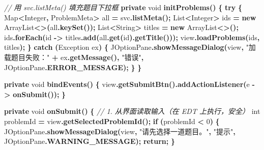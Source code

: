 \documentclass[
  11pt,
]{ctexart}
\newenvironment{Shaded}{\begin{snugshade}}{\end{snugshade}}
\newcommand{\BuiltInTok}[1]{#1}
\newcommand{\CommentTok}[1]{\textcolor[rgb]{0.56,0.35,0.01}{\textit{#1}}}
\newcommand{\ControlFlowTok}[1]{\textcolor[rgb]{0.13,0.29,0.53}{\textbf{#1}}}
\newcommand{\DataTypeTok}[1]{\textcolor[rgb]{0.13,0.29,0.53}{#1}}
\newcommand{\DecValTok}[1]{\textcolor[rgb]{0.00,0.00,0.81}{#1}}
\newcommand{\FunctionTok}[1]{\textcolor[rgb]{0.13,0.29,0.53}{\textbf{#1}}}
\newcommand{\KeywordTok}[1]{\textcolor[rgb]{0.13,0.29,0.53}{\textbf{#1}}}
\newcommand{\NormalTok}[1]{#1}
\newcommand{\OperatorTok}[1]{\textcolor[rgb]{0.81,0.36,0.00}{\textbf{#1}}}
\newcommand{\StringTok}[1]{\textcolor[rgb]{0.31,0.60,0.02}{#1}}
\begin{document}
\begin{Shaded}
\begin{Highlighting}[]
    \CommentTok{// 用 svc.listMeta() 填充题目下拉框}
    \KeywordTok{private} \DataTypeTok{void} \FunctionTok{initProblems}\OperatorTok{()} \OperatorTok{\{}
        \ControlFlowTok{try} \OperatorTok{\{}
            \BuiltInTok{Map}\OperatorTok{\textless{}}\BuiltInTok{Integer}\OperatorTok{,}\NormalTok{ ProblemMeta}\OperatorTok{\textgreater{}}\NormalTok{ all }\OperatorTok{=}\NormalTok{ svc}\OperatorTok{.}\FunctionTok{listMeta}\OperatorTok{();}
            \BuiltInTok{List}\OperatorTok{\textless{}}\BuiltInTok{Integer}\OperatorTok{\textgreater{}}\NormalTok{ ids    }\OperatorTok{=} \KeywordTok{new} \BuiltInTok{ArrayList}\OperatorTok{\textless{}\textgreater{}(}\NormalTok{all}\OperatorTok{.}\FunctionTok{keySet}\OperatorTok{());}
            \BuiltInTok{List}\OperatorTok{\textless{}}\BuiltInTok{String}\OperatorTok{\textgreater{}}\NormalTok{  titles }\OperatorTok{=} \KeywordTok{new} \BuiltInTok{ArrayList}\OperatorTok{\textless{}\textgreater{}();}
\NormalTok{            ids}\OperatorTok{.}\FunctionTok{forEach}\OperatorTok{(}\NormalTok{id }\OperatorTok{{-}\textgreater{}}\NormalTok{ titles}\OperatorTok{.}\FunctionTok{add}\OperatorTok{(}\NormalTok{all}\OperatorTok{.}\FunctionTok{get}\OperatorTok{(}\NormalTok{id}\OperatorTok{).}\FunctionTok{getTitle}\OperatorTok{()));}
\NormalTok{            view}\OperatorTok{.}\FunctionTok{loadProblems}\OperatorTok{(}\NormalTok{ids}\OperatorTok{,}\NormalTok{ titles}\OperatorTok{);}
        \OperatorTok{\}} \ControlFlowTok{catch} \OperatorTok{(}\BuiltInTok{Exception}\NormalTok{ ex}\OperatorTok{)} \OperatorTok{\{}
            \BuiltInTok{JOptionPane}\OperatorTok{.}\FunctionTok{showMessageDialog}\OperatorTok{(}\NormalTok{view}\OperatorTok{,}
                \StringTok{"加载题目失败："} \OperatorTok{+}\NormalTok{ ex}\OperatorTok{.}\FunctionTok{getMessage}\OperatorTok{(),} \StringTok{"错误"}\OperatorTok{,}
                \BuiltInTok{JOptionPane}\OperatorTok{.}\FunctionTok{ERROR\_MESSAGE}\OperatorTok{);}
        \OperatorTok{\}}
    \OperatorTok{\}}

    \KeywordTok{private} \DataTypeTok{void} \FunctionTok{bindEvents}\OperatorTok{()} \OperatorTok{\{}
\NormalTok{        view}\OperatorTok{.}\FunctionTok{getSubmitBtn}\OperatorTok{().}\FunctionTok{addActionListener}\OperatorTok{(}\NormalTok{e }\OperatorTok{{-}\textgreater{}} \FunctionTok{onSubmit}\OperatorTok{());}
    \OperatorTok{\}}

    \KeywordTok{private} \DataTypeTok{void} \FunctionTok{onSubmit}\OperatorTok{()} \OperatorTok{\{}
        \CommentTok{// 1. 从界面读取输入（在 EDT 上执行，安全）}
        \DataTypeTok{int}\NormalTok{ problemId }\OperatorTok{=}\NormalTok{ view}\OperatorTok{.}\FunctionTok{getSelectedProblemId}\OperatorTok{();}
        \ControlFlowTok{if} \OperatorTok{(}\NormalTok{problemId }\OperatorTok{\textless{}} \DecValTok{0}\OperatorTok{)} \OperatorTok{\{}
            \BuiltInTok{JOptionPane}\OperatorTok{.}\FunctionTok{showMessageDialog}\OperatorTok{(}\NormalTok{view}\OperatorTok{,} \StringTok{"请先选择一道题目。"}\OperatorTok{,}
                \StringTok{"提示"}\OperatorTok{,} \BuiltInTok{JOptionPane}\OperatorTok{.}\FunctionTok{WARNING\_MESSAGE}\OperatorTok{);}
            \ControlFlowTok{return}\OperatorTok{;}
        \OperatorTok{\}}


\end{Highlighting}
\end{Shaded}
\end{document}
